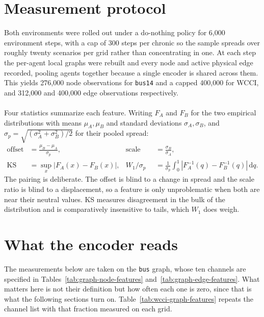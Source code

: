 \section{Measurement protocol}
\label{sec:wcci-protocol}

Both environments were rolled out under a do-nothing policy for 6{,}000
environment steps, with a cap of 300 steps per chronic so the sample spreads
over roughly twenty scenarios per grid rather than concentrating in one. At each
step the per-agent local graphs were rebuilt and every node and active physical
edge recorded, pooling agents together because a single encoder is shared across
them. This yields 276{,}000 node observations for \texttt{bus14} and a capped
400{,}000 for WCCI, and 312{,}000 and 400{,}000 edge observations respectively.
\\
\\
Four statistics summarize each feature. Writing $F_A$ and $F_B$ for the two
empirical distributions with means $\mu_A,\mu_B$ and standard deviations
$\sigma_A,\sigma_B$, and $\sigma_p=\sqrt{(\sigma_A^2+\sigma_B^2)/2}$ for their
pooled spread:
\begin{align}
  \text{offset} &= \frac{\mu_B-\mu_A}{\sigma_p},
  &\text{scale ratio} &= \frac{\sigma_B}{\sigma_A}, \\
  \mathrm{KS} &= \sup_x |F_A(x)-F_B(x)|,
  &W_1/\sigma_p &= \frac{1}{\sigma_p}\int_0^1 |F_A^{-1}(q)-F_B^{-1}(q)|\,\mathrm{d}q .
\end{align}
The pairing is deliberate. The offset is blind to a change in spread and the
scale ratio is blind to a displacement, so a feature is only unproblematic when
both are near their neutral values. KS measures disagreement in the bulk of the
distribution and is comparatively insensitive to tails, which $W_1$ does weigh.


\section{What the encoder reads}
\label{sec:wcci-features}

The measurements below are taken on the \texttt{bus} graph, whose ten channels
are specified in Tables~\ref{tab:graph-node-features}
and~\ref{tab:graph-edge-features}. What matters here is not their definition but
how often each one is zero, since that is what the following sections turn on.
Table~\ref{tab:wcci-graph-features} repeats the channel list with that fraction
measured on each grid.

